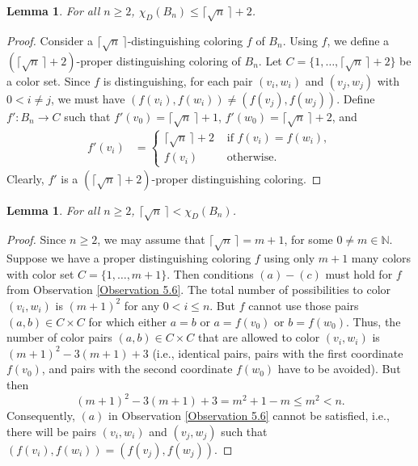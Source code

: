 \documentclass[12pt,reqno,a4paper]{amsart}
\theoremstyle{definition}
\newtheorem{lem}[defn]{Lemma}
\begin{document}
\begin{lem}\label{Lemma 5.7}
 {\em For all $n\geq 2$, $\chi_{D}(B_n) \leq \lceil \sqrt{n}\,\rceil + 2$.}
\end{lem}
\begin{proof}
    Consider a $\lceil \sqrt{n}\,\rceil$-distinguishing coloring $f$ of $B_n$. Using $f$, we define a $(\lceil \sqrt{n}\,\rceil +2)$-proper distinguishing coloring of $B_n$. Let $C= \{1,\dots,\lceil \sqrt{n}\,\rceil+2\}$ be a color set. Since $f$ is distinguishing, for each pair $(v_i,w_i)$ and $(v_j,w_j)$ with $0<i\neq j$, we must have $(f(v_i),f(w_i))\neq (f(v_j),f(w_j))$. Define $f': B_n \to C $ such that $f'(v_0) = \lceil \sqrt{n}\,\rceil+1$, $f'(w_0)= \lceil \sqrt{n}\,\rceil+2$, and
    \begin{align*}
        f'(v_i) &=\begin{cases}
            \lceil \sqrt{n}\,\rceil+2 & \text{ if } f(v_i) = f(w_i),\\
            f(v_i) & \text{ otherwise. }
        \end{cases}    
    \end{align*}
    Clearly, $f'$ is a $(\lceil \sqrt{n}\,\rceil+2)$-proper distinguishing coloring.
\end{proof}
\begin{lem}\label{Lemma 5.8}
   {\em For all $n\geq 2$, $\lceil \sqrt{n}\,\rceil < \chi_{D}(B_n)$.}
\end{lem}
\begin{proof}
    Since $n\geq 2$, we may assume that $\lceil \sqrt{n}\,\rceil = m+1$, for some $0\neq m \in \mathbb{N}$. Suppose we have a proper distinguishing coloring $f$ using only $m+1$ many colors with color set $C=\{1,\dots, m+1\}$. Then conditions $(a)-(c)$ must hold for $f$ from Observation \ref{Observation 5.6}.    
    The total number of possibilities to color $(v_i,w_i)$ is $(m+1)^2$ for any $0<i\leq n$. But $f$ cannot use those pairs $(a,b)\in C\times C$ for which either $a=b$ or $a=f(v_0)$ or $b=f(w_0)$. Thus, the number of color pairs $(a,b)\in C \times C$ that are allowed to color $(v_i,w_i)$ is $(m+1)^2 - 3(m+1) + 3$ (i.e., identical pairs, pairs with the first coordinate $f(v_0)$, and pairs with the second coordinate $f(w_0)$ have to be avoided). But then
$$
     (m+1)^2 - 3(m+1) + 3= m^2 + 1 -m \leq m^2<n.
$$
Consequently, $(a)$ in Observation \ref{Observation 5.6} cannot be satisfied, i.e., there will be pairs $(v_i,w_i)$ and $(v_j,w_j)$ such that $(f(v_i), f(w_i)) = (f(v_j), f(w_j))$.
\end{proof}
\end{document}
